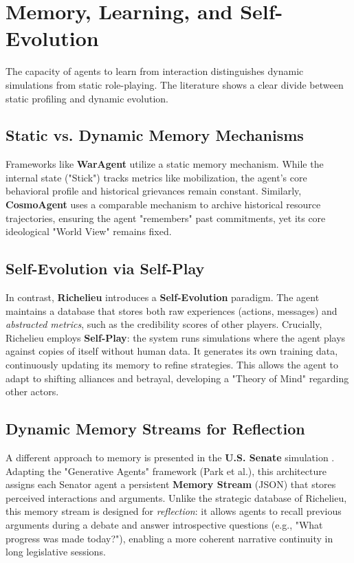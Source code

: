 \section{Memory, Learning, and Self-Evolution}
\label{sec:memory_evolution}

The capacity of agents to learn from interaction distinguishes dynamic simulations from static role-playing. The literature shows a clear divide between static profiling and dynamic evolution.

\subsection{Static vs. Dynamic Memory Mechanisms}
Frameworks like \textbf{WarAgent} utilize a static memory mechanism. While the internal state ("Stick") tracks metrics like mobilization, the agent's core behavioral profile and historical grievances remain constant. Similarly, \textbf{CosmoAgent} uses a comparable mechanism to archive historical resource trajectories, ensuring the agent "remembers" past commitments, yet its core ideological "World View" remains fixed.

\subsection{Self-Evolution via Self-Play}
In contrast, \textbf{Richelieu} \cite{guan2024richelieu} introduces a \textbf{Self-Evolution} paradigm. The agent maintains a database that stores both raw experiences (actions, messages) and \textit{abstracted metrics}, such as the credibility scores of other players.
Crucially, Richelieu employs \textbf{Self-Play}: the system runs simulations where the agent plays against copies of itself without human data. It generates its own training data, continuously updating its memory to refine strategies. This allows the agent to adapt to shifting alliances and betrayal, developing a "Theory of Mind" regarding other actors.

\subsection{Dynamic Memory Streams for Reflection}
A different approach to memory is presented in the \textbf{U.S. Senate} simulation \cite{baker2024simulating}. Adapting the "Generative Agents" framework (Park et al.), this architecture assigns each Senator agent a persistent \textbf{Memory Stream} (JSON) that stores perceived interactions and arguments. Unlike the strategic database of Richelieu, this memory stream is designed for \textit{reflection}: it allows agents to recall previous arguments during a debate and answer introspective questions (e.g., "What progress was made today?"), enabling a more coherent narrative continuity in long legislative sessions.

